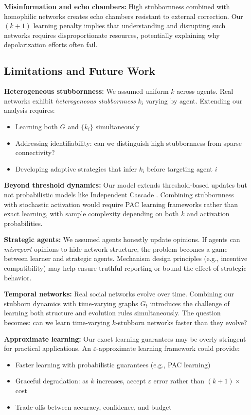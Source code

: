 \documentclass[conference]{IEEEtran}
\begin{document}
\textbf{Misinformation and echo chambers:} High stubbornness combined with homophilic networks creates echo chambers resistant to external correction. Our $(k+1)$ learning penalty implies that understanding and disrupting such networks requires disproportionate resources, potentially explaining why depolarization efforts often fail.

\subsection{Limitations and Future Work}

\textbf{Heterogeneous stubbornness:} We assumed uniform $k$ across agents. Real networks exhibit \emph{heterogeneous stubbornness} $k_i$ varying by agent. Extending our analysis requires:
\begin{itemize}
\item Learning both $G$ and $\{k_i\}$ simultaneously
\item Addressing identifiability: can we distinguish high stubbornness from sparse connectivity?
\item Developing adaptive strategies that infer $k_i$ before targeting agent $i$
\end{itemize}

\textbf{Beyond threshold dynamics:} Our model extends threshold-based updates but not probabilistic models like Independent Cascade \cite{kempe2003maximizing}. Combining stubbornness with stochastic activation would require PAC learning frameworks rather than exact learning, with sample complexity depending on both $k$ and activation probabilities.

\textbf{Strategic agents:} We assumed agents honestly update opinions. If agents can \emph{misreport} opinions to hide network structure, the problem becomes a game between learner and strategic agents. Mechanism design principles (e.g., incentive compatibility) may help ensure truthful reporting or bound the effect of strategic behavior.

\textbf{Temporal networks:} Real social networks evolve over time. Combining our stubborn dynamics with time-varying graphs $G_t$ introduces the challenge of learning both structure and evolution rules simultaneously. The question becomes: can we learn time-varying $k$-stubborn networks faster than they evolve?

\textbf{Approximate learning:} Our exact learning guarantees may be overly stringent for practical applications. An $\varepsilon$-approximate learning framework could provide:
\begin{itemize}
\item Faster learning with probabilistic guarantees (e.g., PAC learning)
\item Graceful degradation: as $k$ increases, accept $\varepsilon$ error rather than $(k+1)\times$ cost
\item Trade-offs between accuracy, confidence, and budget
\end{itemize}
\end{document}
